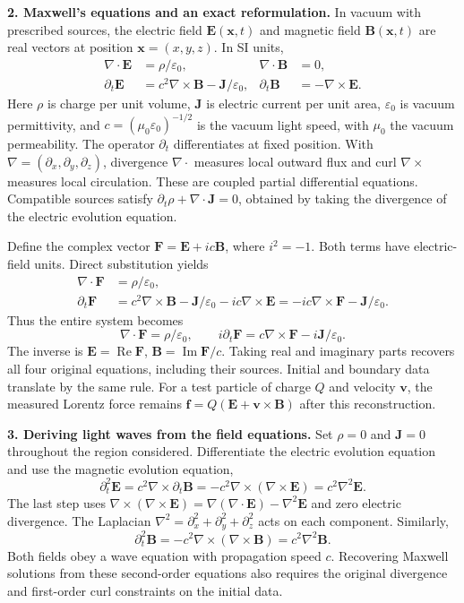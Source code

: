 \documentclass[11pt,letterpaper]{article}
\newcommand{\E}{\mathbf E}
\newcommand{\B}{\mathbf B}
\newcommand{\F}{\mathbf F}
\newcommand{\J}{\mathbf J}
\begin{document}
\textbf{2. Maxwell's equations and an exact reformulation.}
In vacuum with prescribed sources, the electric field $\E(\mathbf x,t)$ and magnetic field $\B(\mathbf x,t)$ are real vectors at position $\mathbf x=(x,y,z)$. In SI units,
\begin{align}
\nabla\cdot\E&=\rho/\varepsilon_0,& \nabla\cdot\B&=0,\label{eq:div}\\
\partial_t\E&=c^2\nabla\times\B-\J/\varepsilon_0,&
\partial_t\B&=-\nabla\times\E.\label{eq:curl}
\end{align}
Here $\rho$ is charge per unit volume, $\J$ is electric current per unit area, $\varepsilon_0$ is vacuum permittivity, and $c=(\mu_0\varepsilon_0)^{-1/2}$ is the vacuum light speed, with $\mu_0$ the vacuum permeability. The operator $\partial_t$ differentiates at fixed position. With $\nabla=(\partial_x,\partial_y,\partial_z)$, divergence $\nabla\cdot$ measures local outward flux and curl $\nabla\times$ measures local circulation. These are coupled partial differential equations. Compatible sources satisfy $\partial_t\rho+\nabla\cdot\J=0$, obtained by taking the divergence of the electric evolution equation.

Define the complex vector $\F=\E+ic\B$, where $i^2=-1$. Both terms have electric-field units. Direct substitution yields
\begin{align}
\nabla\cdot\F&=\rho/\varepsilon_0,\\
\partial_t\F
&=c^2\nabla\times\B-\J/\varepsilon_0-ic\nabla\times\E
=-ic\nabla\times\F-\J/\varepsilon_0.
\end{align}
Thus the entire system becomes
\begin{equation}\boxed{
\nabla\cdot\F=\rho/\varepsilon_0,\qquad
i\partial_t\F=c\nabla\times\F-i\J/\varepsilon_0.}
\end{equation}
The inverse is $\E=\operatorname{Re}\F$, $\B=\operatorname{Im}\F/c$. Taking real and imaginary parts recovers all four original equations, including their sources. Initial and boundary data translate by the same rule. For a test particle of charge $Q$ and velocity $\mathbf v$, the measured Lorentz force remains $\mathbf f=Q(\E+\mathbf v\times\B)$ after this reconstruction.

\textbf{3. Deriving light waves from the field equations.}
Set $\rho=0$ and $\J=0$ throughout the region considered. Differentiate the electric evolution equation and use the magnetic evolution equation,
\begin{equation}
\partial_t^2\E=c^2\nabla\times\partial_t\B
=-c^2\nabla\times(\nabla\times\E)
=c^2\nabla^2\E.
\end{equation}
The last step uses $\nabla\times(\nabla\times\E)=\nabla(\nabla\cdot\E)-\nabla^2\E$ and zero electric divergence. The Laplacian $\nabla^2=\partial_x^2+\partial_y^2+\partial_z^2$ acts on each component. Similarly,
\begin{equation}
\partial_t^2\B=-c^2\nabla\times(\nabla\times\B)=c^2\nabla^2\B.
\end{equation}
Both fields obey a wave equation with propagation speed $c$. Recovering Maxwell solutions from these second-order equations also requires the original divergence and first-order curl constraints on the initial data.
\end{document}
